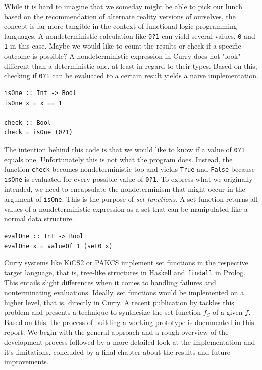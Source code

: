 \documentclass[a4paper, 11pt, fleqn]{scrreprt}
\newcommand{\cinline}[1]{\texttt{#1}}
\begin{document}
While it is hard to imagine that we someday might be able to pick our lunch based on the recommendation of alternate reality versions of ourselves, the concept is far more tangible in the context of functional logic programming languages. A nondeterministic calculation like \cinline{0?1} can yield several values, \cinline{0} and \cinline{1} in this case. Maybe we would like to count the results or check if a specific outcome is possible? A nondeterministic expression in Curry does not "look" different than a deterministic one, at least in regard to their types. Based on this, checking if \cinline{0?1} can be evaluated to a certain result yields a naive implementation.
\begin{verbatim}
isOne :: Int -> Bool
isOne x = x == 1

check :: Bool
check = isOne (0?1)
\end{verbatim}
The intention behind this code is that we would like to know if a value of \cinline{0?1} equals one. Unfortunately this is not what the program does. Instead, the function \cinline{check} becomes nondeterministic too and yields \cinline{True} and \cinline{False} because \cinline{isOne} is evaluated for every possible value of \cinline{0?1}. To express what we originally intended, we need to encapsulate the nondeterminism that might occur in the argument of \cinline{isOne}. This is the purpose of \textit{set functions}. A set function returns all values of a nondeterministic expression as a set that can be manipulated like a normal data structure.

\begin{verbatim}
evalOne :: Int -> Bool
evalOne x = valueOf 1 (set0 x)
\end{verbatim}

Curry systems like KiCS2 or PAKCS implement set functions in the respective target language, that is, tree-like structures in Haskell and \cinline{findall} in Prolog. This entails slight differences when it comes to handling failures and nonterminating evaluations. Ideally, set functions would be implemented on a higher level, that is, directly in Curry. A recent publication by \citet{synsf} tackles this problem and presents a technique to synthesize the set function $f_S$ of a given $f$. Based on this, the process of building a working prototype is documented in this report. We begin with the general approach and a rough overview of the development process followed by a more detailed look at the implementation and it's limitations, concluded by a final chapter about the results and future improvements.
\end{document}
